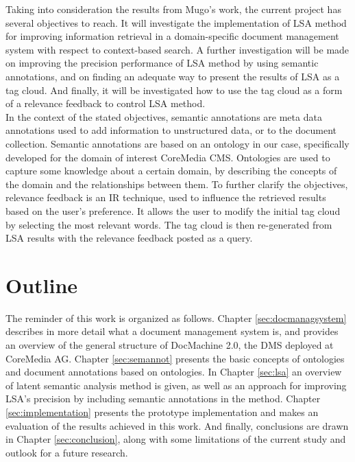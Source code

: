 Taking into consideration the results from Mugo's work, the current project has several objectives to reach. It will investigate the implementation of LSA method for improving information retrieval in a domain-specific document management system with respect to context-based search. A further investigation will be made on improving the precision performance of LSA method by using semantic annotations, and on finding an adequate way to present the results of LSA as a tag cloud. And finally, it will be investigated how to use the tag cloud as a form of a relevance feedback to control LSA method. \\

In the context of the stated objectives, semantic annotations are meta data annotations used to add information to unstructured data, or to the document collection. Semantic annotations are based on an ontology in our case, specifically developed for the domain of interest CoreMedia CMS. Ontologies are used to capture some knowledge about a certain domain, by describing the concepts of the domain and the relationships between them. To further clarify the objectives, relevance feedback is an IR technique, used to influence the retrieved results based on the user's preference. It allows the user to modify the initial tag cloud by selecting the most relevant words. The tag cloud is then re-generated from LSA results with the relevance feedback posted as a query. \\

\section{Outline}
\label{sec:introduction:outline}
The reminder of this work is organized as follows. Chapter \ref{sec:docmanagsystem} describes in more detail what a document management system is, and provides an overview of the general structure of DocMachine 2.0, the DMS deployed at CoreMedia AG. Chapter \ref{sec:semannot} presents the basic concepts of ontologies and document annotations based on ontologies. In Chapter \ref{sec:lsa} an overview of latent semantic analysis method is given, as well as an approach for improving LSA's precision by including semantic annotations in the method. Chapter \ref{sec:implementation} presents the prototype implementation and makes an evaluation of the results achieved in this work. And finally, conclusions are drawn in Chapter \ref{sec:conclusion}, along with some limitations of the current study and outlook for a future research.   \\ 
